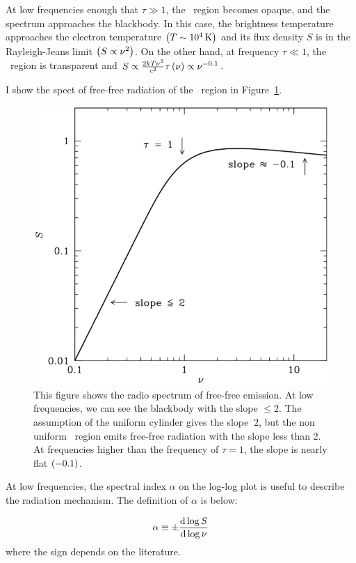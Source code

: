 At low frequencies enough that $\tau \gg 1$, the \ih~region becomes opaque, and the spectrum approaches the blackbody.
In this case, the brightness temperature approaches the electron temperature $\left(T\sim10^4\,\mathrm{K}\right)$ and its flux density $S$ is in the Rayleigh-Jeans limit $\left(S \propto \nu^2\right)$.
On the other hand, at frequency $\tau \ll 1$, the \ih~region is transparent and $S \propto \frac{2kT\nu^2}{c^2}\tau\left(\nu\right) \propto \nu^{-0.1}$.

I show the spect of free-free radiation of the \ih~region in Figure~\ref{fig:nrao_radio4n8}.

\begin{figure}[htbp]
	\centering
	\includegraphics[width=.7\linewidth]{Chapter_2/Figures/NRAO_radio4n8.png}
    \caption[The spectrum of free-free radiation]{\label{fig:nrao_radio4n8}
        This figure shows the radio spectrum of free-free emission.
        At low frequencies, we can see the blackbody with the slope $\leq 2$.
        The assumption of the uniform cylinder gives the slope $~2$, but the non uniform \ih~region emits free-free radiation with the slope less than 2.
        At frequencies higher than the frequency of $\tau=1$, the slope is nearly flat $\left(-0.1\right)$.
    }
\end{figure}

At low frequencies, the spectral index $\alpha$ on the log-log plot is useful to describe the radiation mechanism.
The definition of $\alpha$ is below:

\begin{equation}\label{eq:essential_radio4n55}
    \alpha \equiv \pm \frac{\mathrm{d} \log S}{\mathrm{d} \log \nu}
\end{equation}
where the sign depends on the literature.

